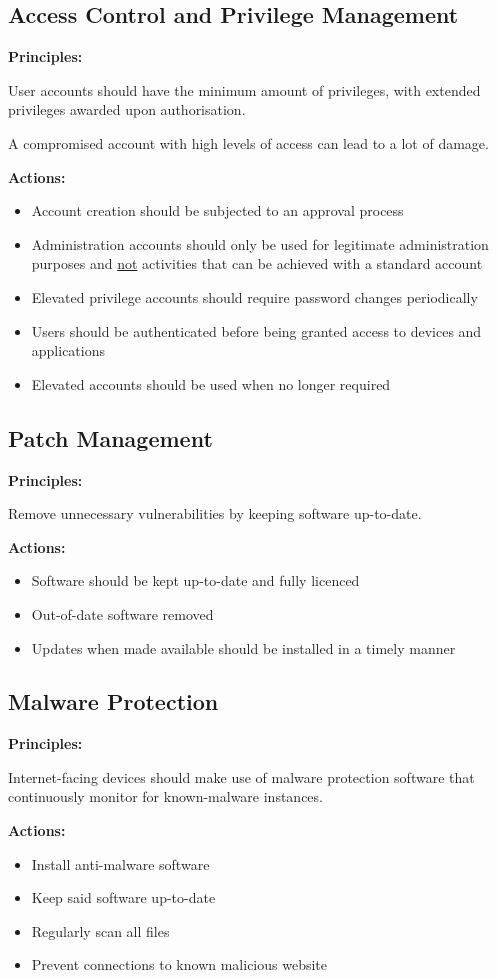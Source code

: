 \documentclass{article}
\begin{document}
\subsection{Access Control and Privilege Management}

\textbf{Principles:}

User accounts should have the minimum amount of privileges, with extended privileges awarded upon authorisation.

A compromised account with high levels of access can lead to a lot of damage.

\textbf{Actions:}

\begin{itemize}
\item 
  Account creation should be subjected to an approval process
\item 
  Administration accounts should only be used for legitimate administration purposes and \underline{not} activities that can be achieved with a standard account
\item 
  Elevated privilege accounts should require password changes periodically
\item 
  Users should be authenticated before being granted access to devices and applications
\item 
  Elevated accounts should be used when no longer required
\end{itemize}

\subsection{Patch Management}

\textbf{Principles:}

Remove unnecessary vulnerabilities by keeping software up-to-date.

\textbf{Actions:}

\begin{itemize}
\item 
  Software should be kept up-to-date and fully licenced
\item 
  Out-of-date software removed
\item 
  Updates when made available should be installed in a timely manner
\end{itemize}

\subsection{Malware Protection}

\textbf{Principles:}

Internet-facing devices should make use of malware protection software that continuously monitor for known-malware instances.

\textbf{Actions:}

\begin{itemize}
\item 
  Install anti-malware software
\item 
  Keep said software up-to-date
\item 
  Regularly scan all files
\item 
  Prevent connections to known malicious website
\end{itemize}
\end{document}
